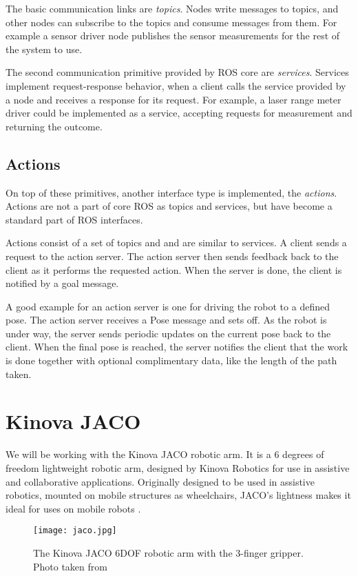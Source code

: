 \documentclass[buriama8_dp.tex]{subfiles}
\begin{document}
The basic communication links are \emph{topics}. Nodes write messages to topics, and other nodes can subscribe to the topics and consume messages from them. For example a sensor driver node publishes the sensor measurements for the rest of the system to use.

The second communication primitive provided by ROS core are \emph{services}. Services implement request-response behavior, when a client calls the service provided by a node and receives a response for its request. For example, a laser range meter driver could be implemented as a service, accepting requests for measurement and returning the outcome.

\subsection{Actions}
\label{subsec:ros_actions}

On top of these primitives, another interface type is implemented, the \emph{actions}. Actions are not a part of core ROS as topics and services, but have become a standard part of ROS interfaces.

Actions consist of a set of topics and and are similar to services. A client sends a request to the action server. The action server then sends feedback back to the client as it performs the requested action. When the server is done, the client is notified by a goal message.

A good example for an action server is one for driving the robot to a defined pose. The action server receives a Pose message and sets off. As the robot is under way, the server sends periodic updates on the current pose back to the client. When the final pose is reached, the server notifies the client that the work is done together with optional complimentary data, like the length of the path taken.


\section{Kinova JACO}
\label{sec:jaco}
We will be working with the Kinova JACO robotic arm. It is a 6 degrees of freedom lightweight robotic arm, designed by Kinova Robotics for use in assistive and collaborative applications. Originally designed to be used in assistive robotics, mounted on mobile structures as wheelchairs, JACO's lightness makes it ideal for uses on mobile robots \cite{kinova}.

\begin{figure}[ht]
  \centering
  \hspace{1cm}\texttt{[image: jaco.jpg]}
  \caption{The Kinova JACO 6DOF robotic arm with the 3-finger gripper. Photo taken from \cite{kinova}}
  \label{fig:jaco}
\end{figure}
\end{document}
